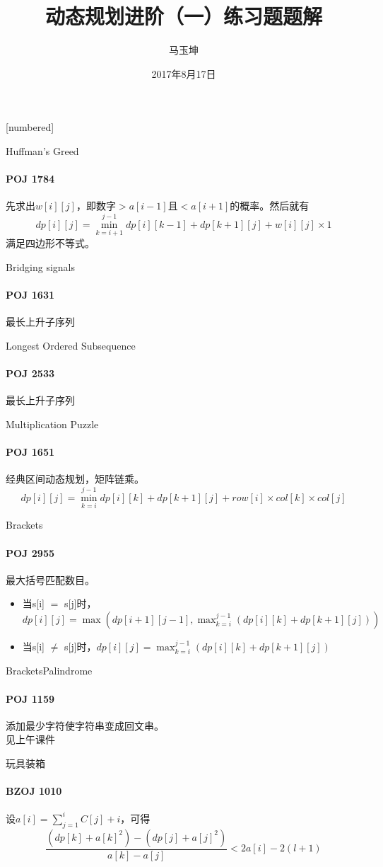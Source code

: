 \documentclass[hyperref={unicode=true}]{beamer}
\theoremstyle{definition}
\theoremstyle{proof}
\begin{document}
[numbered]
\renewcommand\figurename{图}
\renewcommand\tablename{表}
\renewcommand\contentsname{\centering 目录}


\title{动态规划进阶（一）练习题题解}
\author{马玉坤}
\date{2017年8月17日}

\begin{frame}\titlepage\end{frame}

\begin{frame}{Huffman's Greed}
  \framesubtitle{POJ 1784}
  先求出$w[i][j]$，即数字$>a[i-1]$且$<a[i+1]$的概率。然后就有
  \[dp[i][j] = \min_{k=i+1}^{j-1}dp[i][k-1] + dp[k+1][j] + w[i][j] \times 1\]
  满足四边形不等式。
\end{frame}

\begin{frame}{Bridging signals}
  \framesubtitle{POJ 1631}
  最长上升子序列
\end{frame}

\begin{frame}{Longest Ordered Subsequence}
  \framesubtitle{POJ 2533}
  最长上升子序列
\end{frame}
\begin{frame}{Multiplication Puzzle}
  \framesubtitle{POJ 1651}
  经典区间动态规划，矩阵链乘。
  \[dp[i][j] = \min_{k=i}^{j-1}{dp[i][k] + dp[k+1][j] + row[i] \times col[k] \times col[j]}\]
\end{frame}

\begin{frame}{Brackets}
  \framesubtitle{POJ 2955}
  最大括号匹配数目。
  \begin{itemize}
    \item 当s[i] $=$ s[j]时，$dp[i][j] = \max{(dp[i+1][j-1], \max_{k=i}^{j-1}{(dp[i][k]+dp[k+1][j])})}$
    \item 当s[i] $\neq$ s[j]时，$dp[i][j] = \max_{k=i}^{j-1}{(dp[i][k]+dp[k+1][j])}$
  \end{itemize}
\end{frame}

\begin{frame}{Brackets}{Palindrome}
  \framesubtitle{POJ 1159}
  添加最少字符使字符串变成回文串。\\
  见上午课件
\end{frame}

\begin{frame}{玩具装箱}
  \framesubtitle{BZOJ 1010}
  设$a[i] = \sum_{j=1}^i{C[j]} + i$，可得
  \[\frac{(dp[k]+a[k]^2)−(dp[j]+a[j]^2)}{a[k]−a[j]} < 2a[i]−2(l+1)\]
\end{frame}
\end{document}
